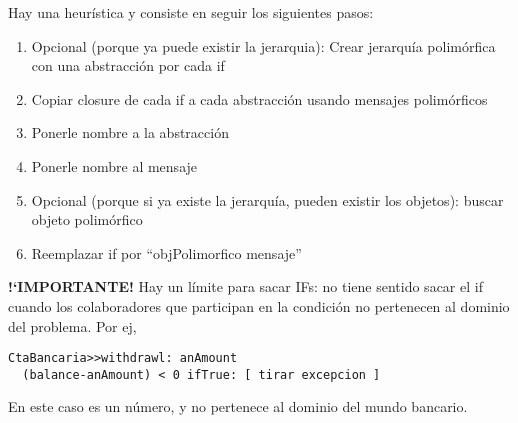 Hay una heur\'istica y consiste en seguir los siguientes pasos:
\begin{enumerate}
\itemsep-0.3em
\item Opcional (porque ya puede existir la jerarquia): Crear jerarqu\'ia polim\'orfica con una abstracci\'on por cada if
\item Copiar closure de cada if a cada abstracci\'on usando mensajes polim\'orficos
\item Ponerle nombre a la abstracci\'on
\item Ponerle nombre al mensaje
\item Opcional (porque si ya existe la jerarqu\'ia, pueden existir los objetos): buscar objeto polim\'orfico
\item Reemplazar if por “objPolimorfico mensaje”
\end{enumerate}

\textbf{!`IMPORTANTE!} Hay un l\'imite para sacar IFs: no tiene sentido sacar el if cuando los colaboradores que participan en la condici\'on no pertenecen al dominio del problema. Por ej, 

\begin{verbatim}
CtaBancaria>>withdrawl: anAmount
  (balance-anAmount) < 0 ifTrue: [ tirar excepcion ]
\end{verbatim}

En este caso  es un n\'umero, y no pertenece al dominio del mundo bancario. 